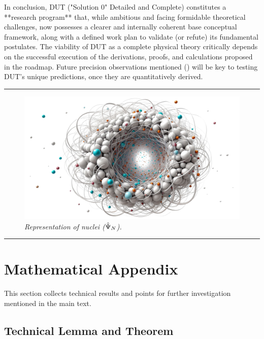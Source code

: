 \documentclass[11pt, a4paper]{article}
\theoremstyle{remark}
\newcommand{\Op}[1]{\hat{#1}}
\begin{document}
In conclusion, DUT ("Solution 0" Detailed and Complete) constitutes a **research program** that, while ambitious and facing formidable theoretical challenges, now possesses a clearer and internally coherent base conceptual framework, along with a defined work plan to validate (or refute) its fundamental postulates. The viability of DUT as a complete physical theory critically depends on the successful execution of the derivations, proofs, and calculations proposed in the roadmap. Future precision observations mentioned () will be key to testing DUT's unique predictions, once they are quantitatively derived.

\bigskip
\hrule

\vfill
\begin{figure}[htbp]
    \centering
    \includegraphics[width=0.9\linewidth]{OIG39.ZNLJ.PNG}
    \caption{%
     \footnotesize\textit{Representation of nuclei (\(\protect\Op{\Psi}_N\)).}
    }
    \label{fig:Figura20}
\end{figure}
\vfill
\bigskip
\hrule
\vfill


\appendix

\section{Mathematical Appendix}
\label{sec:apendice_matematico}

This section collects technical results and points for further investigation mentioned in the main text.

\subsection{Technical Lemma and Theorem}
\end{document}
